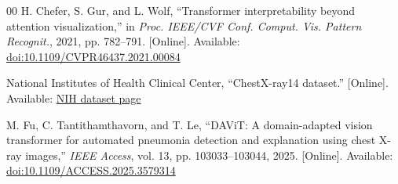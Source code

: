 \documentclass[conference]{IEEEtran}
\begin{document}
\begin{thebibliography}{00}
H. Chefer, S. Gur, and L. Wolf, ``Transformer interpretability beyond attention visualization,'' in \emph{Proc. IEEE/CVF Conf. Comput. Vis. Pattern Recognit.}, 2021, pp. 782--791. [Online]. Available: \href{https://doi.org/10.1109/CVPR46437.2021.00084}{doi:10.1109/CVPR46437.2021.00084}

National Institutes of Health Clinical Center, ``ChestX-ray14 dataset.'' [Online]. Available: \href{https://nihcc.app.box.com/v/ChestXray-Nihcc}{NIH dataset page}

M. Fu, C. Tantithamthavorn, and T. Le, ``DAViT: A domain-adapted vision transformer for automated pneumonia detection and explanation using chest X-ray images,'' \emph{IEEE Access}, vol. 13, pp. 103033--103044, 2025. [Online]. Available: \href{https://doi.org/10.1109/ACCESS.2025.3579314}{doi:10.1109/ACCESS.2025.3579314}

\end{thebibliography}
\end{document}
